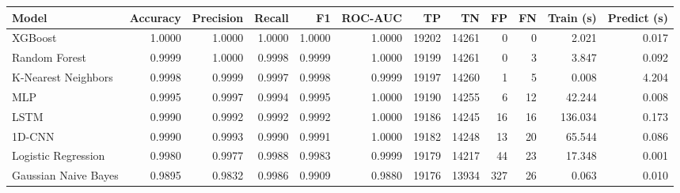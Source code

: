 \begin{tabular}{lrrrrrrrrrrr}
\toprule
Model & Accuracy & Precision & Recall & F1 & ROC-AUC & TP & TN & FP & FN & Train (s) & Predict (s) \\
\midrule
XGBoost & 1.0000 & 1.0000 & 1.0000 & 1.0000 & 1.0000 & 19202 & 14261 & 0 & 0 & 2.021 & 0.017 \\
Random Forest & 0.9999 & 1.0000 & 0.9998 & 0.9999 & 1.0000 & 19199 & 14261 & 0 & 3 & 3.847 & 0.092 \\
K-Nearest Neighbors & 0.9998 & 0.9999 & 0.9997 & 0.9998 & 0.9999 & 19197 & 14260 & 1 & 5 & 0.008 & 4.204 \\
MLP & 0.9995 & 0.9997 & 0.9994 & 0.9995 & 1.0000 & 19190 & 14255 & 6 & 12 & 42.244 & 0.008 \\
LSTM & 0.9990 & 0.9992 & 0.9992 & 0.9992 & 1.0000 & 19186 & 14245 & 16 & 16 & 136.034 & 0.173 \\
1D-CNN & 0.9990 & 0.9993 & 0.9990 & 0.9991 & 1.0000 & 19182 & 14248 & 13 & 20 & 65.544 & 0.086 \\
Logistic Regression & 0.9980 & 0.9977 & 0.9988 & 0.9983 & 0.9999 & 19179 & 14217 & 44 & 23 & 17.348 & 0.001 \\
Gaussian Naive Bayes & 0.9895 & 0.9832 & 0.9986 & 0.9909 & 0.9880 & 19176 & 13934 & 327 & 26 & 0.063 & 0.010 \\
\bottomrule
\end{tabular}
